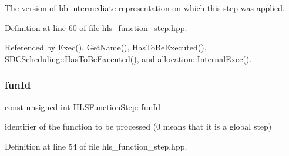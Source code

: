 The version of bb intermediate representation on which this step was applied. 



Definition at line 60 of file hls\+\_\+function\+\_\+step.\+hpp.



Referenced by Exec(), Get\+Name(), Has\+To\+Be\+Executed(), S\+D\+C\+Scheduling\+::\+Has\+To\+Be\+Executed(), and allocation\+::\+Internal\+Exec().

\mbox{\label{classHLSFunctionStep_a3e6434fd86c698b0c70520b859bff5b0}} 
\subsubsection{\texorpdfstring{fun\+Id}{funId}}
{\footnotesize\ttfamily const unsigned int H\+L\+S\+Function\+Step\+::fun\+Id\hspace{0.3cm}{\ttfamily [protected]}}



identifier of the function to be processed (0 means that it is a global step) 



Definition at line 54 of file hls\+\_\+function\+\_\+step.\+hpp.



